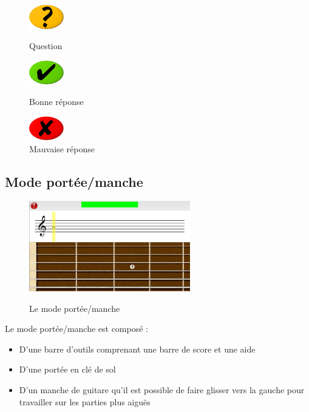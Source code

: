 \documentclass{scrreprt}
\begin{document}
\begin{figure}[!ht]
   \centering
   \begin{minipage}[t]{5.5cm}
      \centering
      \includegraphics[width=1.5cm]{images/fingering_question.png}
      \caption{Question}
	\label{fig:fig1}
   \end{minipage}
   \begin{minipage}[t]{5.5cm}
      \centering
      \includegraphics[width=1.5cm]{images/fingering_good.png}
      \caption{Bonne réponse}
	\label{fig:fig2}
   \end{minipage}
   \begin{minipage}[t]{5.5cm}
      \centering
      \includegraphics[width=1.5cm]{images/fingering_bad.png}
      \caption{Mauvaise réponse}
	\label{fig:fig3}
   \end{minipage}
\end{figure}

\newpage

\subsection{Mode portée/manche}

\begin{center}
\begin{figure}[!ht]
     \centering\includegraphics[width=7cm]{images/portee_first_question.png}
	\label{fig:p_m}
      \caption{Le mode portée/manche}
\end{figure}
\end{center}

\noindent Le mode portée/manche est composé :
\begin{itemize}
	\item D'une barre d'outils comprenant une barre de score et une aide
	\item D'une portée en clé de sol
	\item D'un manche de guitare qu'il est possible de faire glisser vers la gauche pour travailler sur les parties plus aiguës
\end{itemize}
\end{document}
